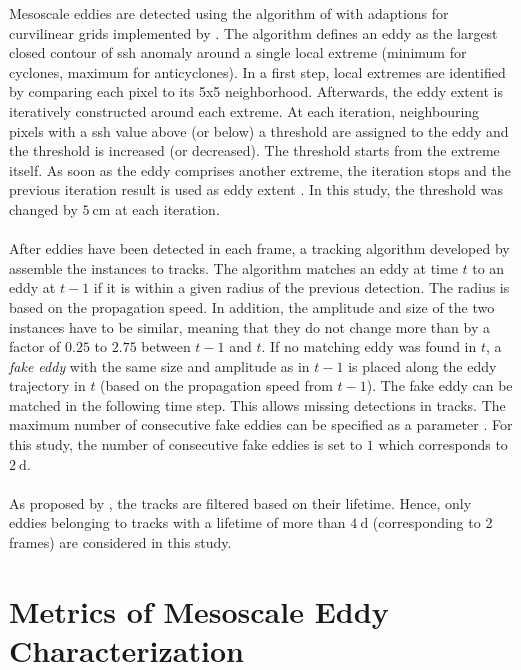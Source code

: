 Mesoscale eddies are detected using the algorithm of \textcite{faghmous-2015} with adaptions for curvilinear grids implemented by \textcite{lovecchio-2018-faghmous-adaption}. The algorithm defines an eddy as the largest closed contour of \ac{ssh} anomaly around a single local extreme (minimum for cyclones, maximum for anticyclones). In a first step, local extremes are identified by comparing each pixel to its 5x5 neighborhood. Afterwards, the eddy extent is iteratively constructed around each extreme. At each iteration, neighbouring pixels with a \ac{ssh} value above (or below) a threshold are assigned to the eddy and the threshold is increased (or decreased). The threshold starts from the extreme itself. As soon as the eddy comprises another extreme, the iteration stops and the previous iteration result is used as eddy extent \autocite[see their Figure 1.2]{faghmous-2015}. In this study, the threshold was changed by $\SI{5}{\centi\metre}$ at each iteration.\\
\\
After eddies have been detected in each frame, a tracking algorithm developed by \textcite{chelton-2011} assemble the instances to tracks. The algorithm matches an eddy at time $t$ to an eddy at $t-1$ if it is within a given radius of the previous detection. The radius is based on the propagation speed. In addition, the amplitude and size of the two instances have to be similar, meaning that they do not change more than by a factor of $0.25$ to $2.75$ between $t-1$ and $t$. If no matching eddy was found in $t$, a \textit{fake eddy} with the same size and amplitude as in $t-1$ is placed along the eddy trajectory in $t$ (based on the propagation speed from $t-1$). The fake eddy can be matched in the following time step. This allows missing detections in tracks. The maximum number of consecutive fake eddies can be specified as a parameter \autocite[see their Figure 2]{faghmous-2015}. For this study, the number of consecutive fake eddies is set to $1$ which corresponds to $\SI{2}{\day}$.\\
\\
As proposed by \textcite{faghmous-2015}, the tracks are filtered based on their lifetime. Hence, only eddies belonging to tracks with a lifetime of more than $\SI{4}{\day}$ (corresponding to 2 frames) are considered in this study.

\section{Metrics of Mesoscale Eddy Characterization}\label{sec:data-methods-eddymetrics}

